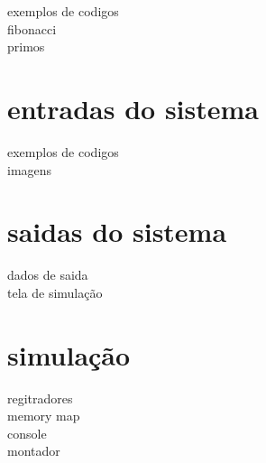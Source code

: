 exemplos de codigos\\
fibonacci\\
primos\\

\section{entradas do sistema}
	exemplos de codigos\\
	imagens\\

\section{saidas do sistema}
	dados de saida\\
	tela de simulação

\section{simulação}
	regitradores\\
	memory map\\
	console\\
	montador\\


